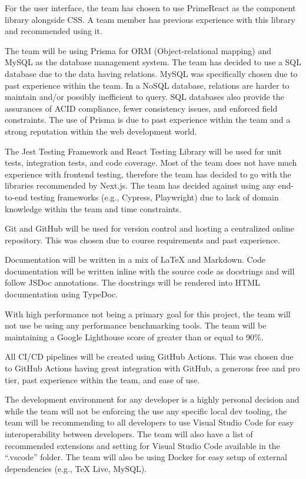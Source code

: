 \documentclass{article}
\begin{document}
For the user interface, the team has chosen to use PrimeReact as the component library alongside
CSS. A team member has previous experience with this library and recommended using it.

The team will be using Prisma for ORM (Object-relational mapping) and MySQL as the database
management system. The team has decided to use a SQL database due to the data having relations.
MySQL was specifically chosen due to past experience within the team. In a NoSQL database,
relations are harder to maintain and/or possibly inefficient to query. SQL databases also provide
the assurances of ACID compliance, fewer consistency issues, and enforced field constraints. The
use of Prisma is due to past experience within the team and a strong reputation within the web
development world.

The Jest Testing Framework and React Testing Library will be used for unit tests, integration
tests, and code coverage. Most of the team does not have much experience with frontend testing,
therefore the team has decided to go with the libraries recommended by Next.js. The team has
decided against using any end-to-end testing frameworks (e.g., Cypress, Playwright) due to lack of
domain knowledge within the team and time constraints.

Git and GitHub will be used for version control and hosting a centralized online repository. This
was chosen due to course requirements and past experience.

Documentation will be written in a mix of \LaTeX{} and Markdown. Code documentation will be written
inline with the source code as docstrings and will follow JSDoc annotations. The docstrings will be
rendered into HTML documentation using TypeDoc.

With high performance not being a primary goal for this project, the team will not use be using any
performance benchmarking tools. The team will be maintaining a Google Lighthouse score of greater
than or equal to 90\%.

All CI/CD pipelines will be created using GitHub Actions. This was chosen due to GitHub Actions
having great integration with GitHub, a generous free and pro tier, past experience within the
team, and ease of use.

The development environment for any developer is a highly personal decision and while the team will
not be enforcing the use any specific local dev tooling, the team will be recommending to all
developers to use Visual Studio Code for easy interoperability between developers. The team will
also have a list of recommended extensions and setting for Visual Studio Code available in the
``.vscode'' folder. The team will also be using Docker for easy setup of external dependencies
(e.g., TeX Live, MySQL).
\end{document}
